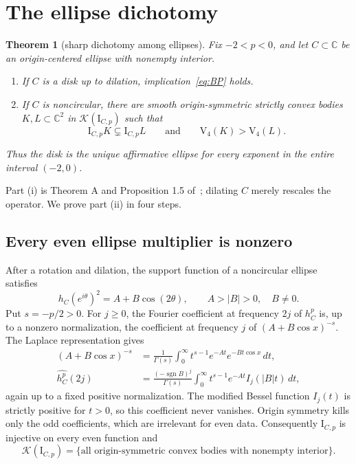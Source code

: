 \documentclass[11pt]{article}
\newtheorem{theorem}{Theorem}
\newcommand{\C}{\mathbb C}
\newcommand{\Vol}{\mathrm V}
\newcommand{\I}{\mathrm I}
\newcommand{\Kc}{\mathcal K}
\begin{document}
\section{The ellipse dichotomy}

\begin{theorem}[sharp dichotomy among ellipses]\label{thm:main}
Fix $-2<p<0$, and let $C\subset\C$ be an origin-centered ellipse with
nonempty interior.
\begin{enumerate}[label=\textup{(\roman*)}]
\item If $C$ is a disk up to dilation, implication~\eqref{eq:BP} holds.
\item If $C$ is noncircular, there are smooth origin-symmetric strictly
convex bodies $K,L\subset\C^2$ in $\Kc(\I_{C,p})$ such that
\[
 \I_{C,p}K\subsetneq\I_{C,p}L
 \qquad\text{and}\qquad
 \Vol_4(K)>\Vol_4(L).
\]
\end{enumerate}
Thus the disk is the unique affirmative ellipse for every exponent in the
entire interval $(-2,0)$.
\end{theorem}

Part (i) is Theorem A and Proposition 1.5 of~\cite{EH}; dilating $C$ merely
rescales the operator.  We prove part (ii) in four steps.

\subsection{Every even ellipse multiplier is nonzero}

After a rotation and dilation, the support function of a noncircular ellipse
satisfies
\[
 h_C(e^{i\theta})^2=A+B\cos(2\theta),
 \qquad A>|B|>0,\quad B\ne0.
\]
Put $s=-p/2>0$.  For $j\ge0$, the Fourier coefficient at frequency $2j$ of
$h_C^p$ is, up to a nonzero normalization, the coefficient at frequency $j$
of $(A+B\cos x)^{-s}$.  The Laplace representation gives
\begin{align*}
 (A+B\cos x)^{-s}
 &=\frac1{\Gamma(s)}\int_0^\infty
 t^{s-1}e^{-At}e^{-Bt\cos x}\,dt,\\
 \widehat{h_C^p}(2j)
 &=\frac{(-\operatorname{sgn}B)^j}{\Gamma(s)}
 \int_0^\infty t^{s-1}e^{-At}I_j(|B|t)\,dt,
\end{align*}
again up to a fixed positive normalization.  The modified Bessel function
$I_j(t)$ is strictly positive for $t>0$, so this coefficient never vanishes.
Origin symmetry kills only the odd coefficients, which are irrelevant for
even data.  Consequently $\I_{C,p}$ is injective on every even function and
\begin{equation}\label{eq:inj-all}
 \Kc(\I_{C,p})
 =\{\text{all origin-symmetric convex bodies with nonempty interior}\}.
\end{equation}
\end{document}
